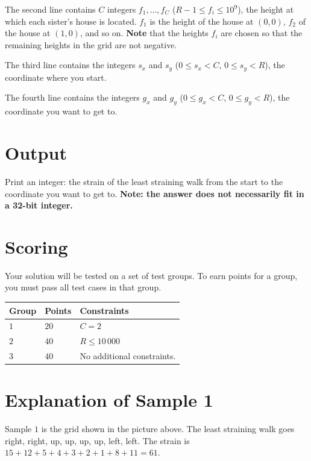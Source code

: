 The second line contains $C$ integers $f_1, \dots, f_C$ ($R-1 \leq f_i \leq 10^9$),
the height at which each sister's house is located.
$f_1$ is the height of the house at $(0,0)$, $f_2$ of the house at $(1,0)$, and so on.
\textbf{Note} that the heights $f_i$ are chosen so that the remaining heights in the grid are not negative.

The third line contains the integers $s_x$ and $s_y$ ($0 \leq s_x < C$, $0 \leq s_y < R$),
the coordinate where you start.

The fourth line contains the integers $g_x$ and $g_y$ ($0 \leq g_x < C$, $0 \leq g_y < R$),
the coordinate you want to get to.

\section*{Output}
Print an integer: the strain of the least straining walk from the start to the coordinate you want to get to.
\textbf{Note: the answer does not necessarily fit in a 32-bit integer.}

\section*{Scoring}
Your solution will be tested on a set of test groups.
To earn points for a group, you must pass all test cases in that group.

\noindent
\begin{tabular}{| l | l | p{12cm} |}
  \hline
  \textbf{Group} & \textbf{Points} & \textbf{Constraints} \\ \hline
  $1$    & $20$  & $C = 2$ \\ \hline
  $2$    & $40$  & $R \leq 10\,000$ \\ \hline
  $3$    & $40$  & No additional constraints. \\ \hline
\end{tabular}

\section*{Explanation of Sample 1}
Sample $1$ is the grid shown in the picture above.
The least straining walk goes right, right, up, up, up, up, left, left.
The strain is $15+12+5+4+3+2+1+8+11=61$.
